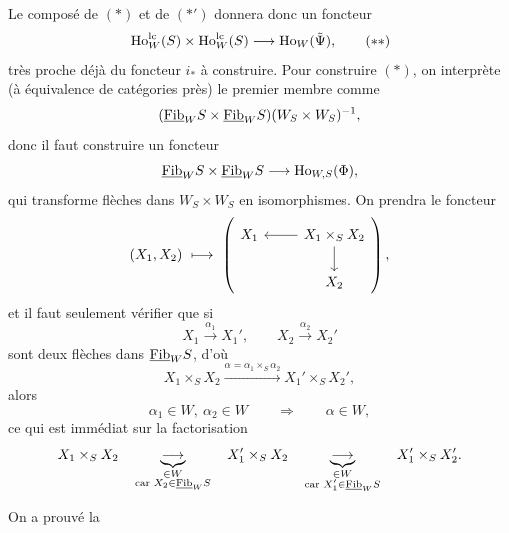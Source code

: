 Le composé de $(*)$ et de $(*')$ donnera donc un foncteur
\[
\mathrm{Ho}^{\mathrm{lc}}_W(S) \times \mathrm{Ho}^{\mathrm{lc}}_W(S) \longrightarrow \mathrm{Ho}_W(\tilde{\Psi}), \tag*{$(**)$}
\]
très proche déjà du foncteur $i_*$ à construire. Pour construire $(*)$, on interprète (à équivalence de catégories près) le premier membre comme
\[
(\underline{\mathrm{Fib}}_W S \times \underline{\mathrm{Fib}}_W S)(W_S \times W_S)^{-1},
\]
donc il faut construire un foncteur
\[
\underline{\mathrm{Fib}}_W S \times \underline{\mathrm{Fib}}_W S \longrightarrow \mathrm{Ho}_{W,S}(\Phi),
\]
qui transforme flèches dans $W_S \times W_S$ en isomorphismes. On prendra le foncteur
\[
(X_1, X_2) \ \longmapsto \
\left(
\begin{tikzcd}[ampersand replacement=\&]
X_1 \& X_1 \times_S X_2 \arrow[l] \arrow[d] \\
 \& X_2
\end{tikzcd}
\right),
\]
et il faut seulement vérifier que si
\[
X_1 \xrightarrow{\alpha_1} X_1', \qquad X_2 \xrightarrow{\alpha_2} X_2'
\]
sont deux flèches dans $\underline{\mathrm{Fib}}_W S$, d'où
\[
X_1 \times_S X_2 \xrightarrow{\alpha = \alpha_1 \times_S \alpha_2} X_1' \times_S X_2',
\]
alors
\[
\alpha_1 \in W,\ \alpha_2 \in W \qquad \Longrightarrow \qquad \alpha \in W,
\]
ce qui est immédiat sur la factorisation
\[
X_1 \times_S X_2 \quad \underbrace{\longrightarrow}_{\substack{\in W \\ \text{car } X_2 \in \underline{\mathrm{Fib}}_W S}} \quad X_1' \times_S X_2 \quad \underbrace{\longrightarrow}_{\substack{\in W \\ \text{car } X_1' \in \underline{\mathrm{Fib}}_W S}} \quad X_1' \times_S X_2'.
\]

On a prouvé la

